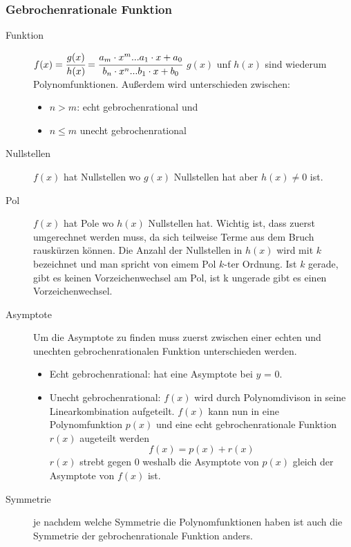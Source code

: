 \documentclass[a4paper]{scrartcl}
\begin{document}
        \subsubsection{Gebrochenrationale Funktion}
        \begin{description}
            \item[Funktion] $f(x) = \cfrac{g(x)}{h(x)}= \cfrac{a_m \cdot x^m...a_1 \cdot x + a_0}{b_n \cdot x^n...b_1 \cdot x + b_0}$ $g(x)$ unf $h(x)$ sind wiederum Polynomfunktionen. Außerdem wird unterschieden zwischen:
            \begin{itemize}
                \item $n > m$: echt gebrochenrational und
                \item $n \leq m$ unecht gebrochenrational
            \end{itemize}   
            \item[Nullstellen] $f(x)$ hat Nullstellen wo $g(x)$ Nullstellen hat aber $h(x) \neq 0$ ist.  
            \item[Pol] $f(x)$ hat Pole wo $h(x)$ Nullstellen hat. Wichtig ist, dass zuerst umgerechnet werden muss, da sich teilweise Terme aus dem Bruch rauskürzen können.
            Die Anzahl der Nullstellen in $h(x)$ wird mit $k$ bezeichnet und man spricht von eimem Pol $k$-ter Ordnung. Ist $k$
            gerade, gibt es keinen Vorzeichenwechsel am Pol, ist k ungerade gibt es einen Vorzeichenwechsel.
             \item[Asymptote] Um die Asymptote zu finden muss zuerst zwischen einer echten und unechten gebrochenrationalen Funktion unterschieden werden.
                \begin{itemize}
                    \item Echt gebrochenrational: hat eine Asymptote bei $y$ = 0.
                    \item Unecht gebrochenrational: $f(x)$ wird durch Polynomdivison in seine Linearkombination aufgeteilt. $f(x)$ kann nun in eine Polynomfunktion $p(x)$ und
                    eine echt gebrochenrationale Funktion $r(x)$ augeteilt werden  
                    \begin{equation*}
                        f(x) = p(x) + r(x)
                    \end{equation*}
                    $r(x)$ strebt gegen 0 weshalb die Asymptote von $p(x)$ gleich der Asymptote von $f(x)$ ist.
                \end{itemize}
             \item[Symmetrie] je nachdem welche Symmetrie die Polynomfunktionen haben ist auch die Symmetrie der gebrochenrationale Funktion anders. 

\end{description}
\end{document}
